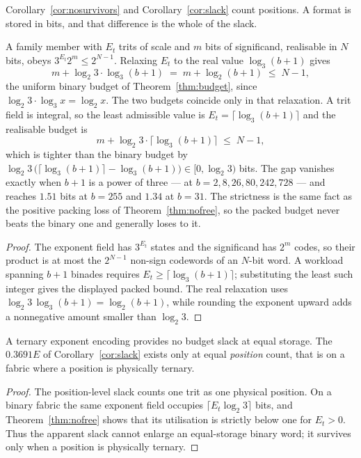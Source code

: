 Corollary~\ref{cor:nosurvivors} and Corollary~\ref{cor:slack} count positions.
A format is stored in bits, and that difference is the whole of the slack.

\begin{theorem}
\label{thm:packedcov}
A family member with $E_t$ trits of scale and $m$ bits of significand, realisable
in $N$ bits, obeys $3^{E_t}2^{m} \le 2^{N-1}$. Relaxing $E_t$ to the real value
$\log_3(b+1)$ gives
\[
  m + \log_2 3 \cdot \log_3(b+1) \;=\; m + \log_2(b+1) \;\le\; N-1 ,
\]
the uniform binary budget of Theorem~\ref{thm:budget}, since
$\log_2 3 \cdot \log_3 x = \log_2 x$. The two budgets coincide only in that
relaxation. A trit field is integral, so the least admissible value is
$E_t = \lceil\log_3(b+1)\rceil$ and the realisable budget is
\[
  m + \log_2 3 \cdot \bigl\lceil \log_3(b+1) \bigr\rceil \;\le\; N-1 ,
\]
which is tighter than the binary budget by
$\log_2 3\,\bigl(\lceil\log_3(b+1)\rceil - \log_3(b+1)\bigr) \in [0, \log_2 3)$
bits. The gap vanishes exactly when $b+1$ is a power of three --- at
$b = 2, 8, 26, 80, 242, 728$ --- and reaches $1.51$ bits at $b = 255$ and $1.34$
at $b = 31$. The strictness is the same fact as the positive packing loss of
Theorem~\ref{thm:nofree}, so the packed budget never beats the binary one and
generally loses to it.
\end{theorem}
\begin{proof}
The exponent field has $3^{E_t}$ states and the significand has $2^m$ codes,
so their product is at most the $2^{N-1}$ non-sign codewords of an $N$-bit
word.  A workload spanning $b+1$ binades requires
$E_t\geq\lceil\log_3(b+1)\rceil$; substituting the least such integer gives
the displayed packed bound.  The real relaxation uses
$\log_2 3\,\log_3(b+1)=\log_2(b+1)$, while rounding the exponent upward
adds a nonnegative amount smaller than $\log_2 3$.
\end{proof}

\begin{corollary}
\label{cor:slackartefact}
A ternary exponent encoding provides no budget slack at equal storage. The
$0.3691E$ of Corollary~\ref{cor:slack} exists only at equal \emph{position}
count, that is on a fabric where a position is physically ternary.
\end{corollary}
\begin{proof}
The position-level slack counts one trit as one physical position.  On a binary
fabric the same exponent field occupies $\lceil E_t\log_2 3\rceil$ bits, and
Theorem~\ref{thm:nofree} shows that its utilisation is strictly below one for
$E_t>0$.  Thus the apparent slack cannot enlarge an equal-storage binary word;
it survives only when a position is physically ternary.
\end{proof}

